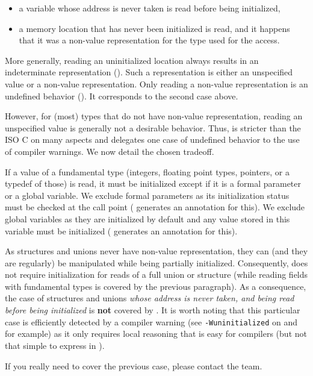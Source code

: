 \begin{itemize}
\item {} a variable whose address is never taken is read before
      being initialized,
\item a memory location that has never been initialized is read, and it happens
      that it was a non-value representation for the type used for the access.
\end{itemize}

More generally, reading an uninitialized location always results in an
indeterminate representation (). Such a representation is either
an unspecified value or a non-value representation. Only reading a non-value
representation is an undefined behavior (). It corresponds to
the second case above.

However, for (most) types that do not have non-value representation, reading an
unspecified value is generally not a desirable behavior. Thus, \rte{} is
stricter than the ISO C on many aspects and delegates one case of undefined
behavior to the use of compiler warnings. We now detail the chosen tradeoff.

If a value of a fundamental type (integers, floating point types, pointers, or
a typedef of those) is read, it must be initialized except if it is a formal
parameter or a global variable. We exclude formal parameters as its
initialization status must be checked at the call point (\rte{} generates an
annotation for this). We exclude global variables as they are initialized by
default and any value stored in this variable must be initialized (\rte{}
generates an annotation for this).

As structures and unions never have non-value representation, they can (and they are
regularly) be manipulated while being partially initialized. Consequently,
\rte{} does not require initialization for reads of a full union or structure
(while reading fields with fundamental types is covered by the previous paragraph).
As a consequence, the case of structures and unions \textit{whose address is
 never taken, and being read before being initialized} is \textbf{not} covered
by \rte{}. It is worth noting that
this particular case is efficiently detected by a compiler warning (see
\lstinline{-Wuninitialized} on \gcc{} and \clang{} for example) as it only
requires local reasoning that is easy for compilers (but not that simple to
express in \acsl{}).

If you really need \rte{} to cover the previous case, please contact the
\framac{} team.

